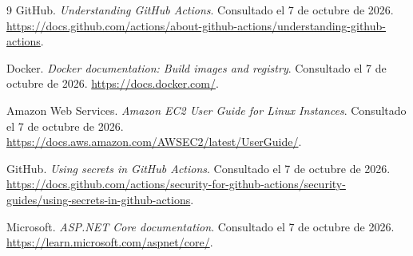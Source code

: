 \documentclass[12pt,a4paper]{report}
\begin{document}
\begin{thebibliography}{9}
GitHub. \textit{Understanding GitHub Actions}. Consultado el 7 de octubre de 2026. \url{https://docs.github.com/actions/about-github-actions/understanding-github-actions}.

Docker. \textit{Docker documentation: Build images and registry}. Consultado el 7 de octubre de 2026. \url{https://docs.docker.com/}.

Amazon Web Services. \textit{Amazon EC2 User Guide for Linux Instances}. Consultado el 7 de octubre de 2026. \url{https://docs.aws.amazon.com/AWSEC2/latest/UserGuide/}.

GitHub. \textit{Using secrets in GitHub Actions}. Consultado el 7 de octubre de 2026. \url{https://docs.github.com/actions/security-for-github-actions/security-guides/using-secrets-in-github-actions}.

Microsoft. \textit{ASP.NET Core documentation}. Consultado el 7 de octubre de 2026. \url{https://learn.microsoft.com/aspnet/core/}.
\end{thebibliography}
\end{document}
